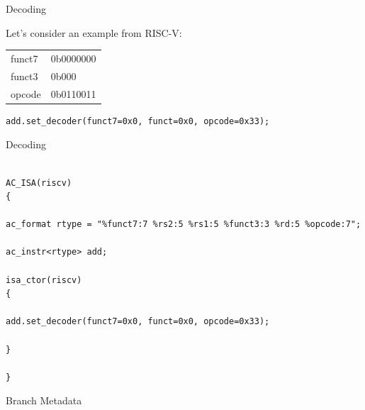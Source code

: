 \begin{frame}[fragile]{Decoding}

Let's consider an example from RISC-V:

\pause


\bigskip
\pause


\pause
\bigskip

\ttfamily\scriptsize{
\begin{tabular}{l l}
funct7 & 0b0000000 \\
funct3 & 0b000 \\
opcode & 0b0110011 \\
\end{tabular}
}

\pause

\begin{lstlisting}
add.set_decoder(funct7=0x0, funct=0x0, opcode=0x33);
\end{lstlisting}

\end{frame}

\begin{frame}[fragile]{Decoding}

\begin{lstlisting}

AC_ISA(riscv)
{

ac_format rtype = "%funct7:7 %rs2:5 %rs1:5 %funct3:3 %rd:5 %opcode:7";

ac_instr<rtype> add;

isa_ctor(riscv)
{

add.set_decoder(funct7=0x0, funct=0x0, opcode=0x33);

}

}

\end{lstlisting}
\end{frame}


\begin{frame}{Branch Metadata}



\end{frame}
